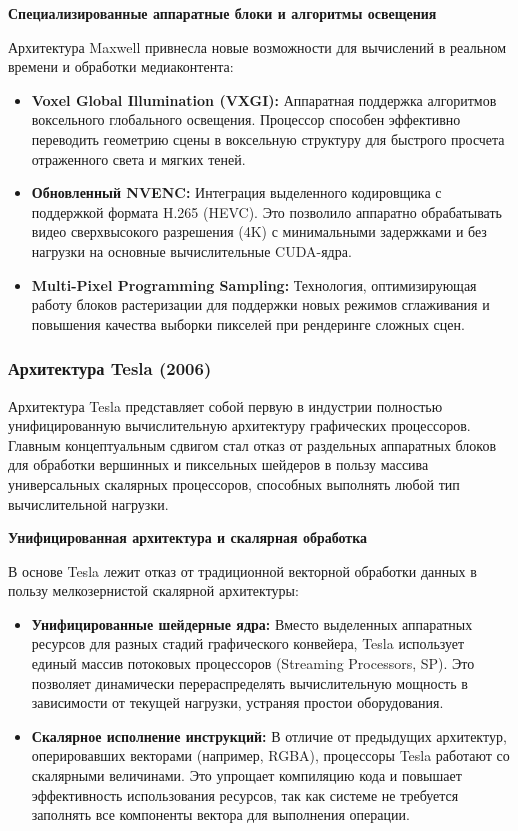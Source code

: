 \documentclass{article}[14pt]
\begin{document}
\medskip \noindent \textbf{Специализированные аппаратные блоки и алгоритмы освещения}

Архитектура Maxwell привнесла новые возможности для вычислений в реальном времени и обработки медиаконтента:
\begin{itemize}
    \item \textbf{Voxel Global Illumination (VXGI):} Аппаратная поддержка алгоритмов воксельного глобального освещения. Процессор способен эффективно переводить геометрию сцены в воксельную структуру для быстрого просчета отраженного света и мягких теней.
    \item \textbf{Обновленный NVENC:} Интеграция выделенного кодировщика с поддержкой формата H.265 (HEVC). Это позволило аппаратно обрабатывать видео сверхвысокого разрешения (4K) с минимальными задержками и без нагрузки на основные вычислительные CUDA-ядра.
    \item \textbf{Multi-Pixel Programming Sampling:} Технология, оптимизирующая работу блоков растеризации для поддержки новых режимов сглаживания и повышения качества выборки пикселей при рендеринге сложных сцен.
\end{itemize}

\subsubsection{Архитектура Tesla (2006)}

Архитектура Tesla представляет собой первую в индустрии полностью унифицированную вычислительную архитектуру графических процессоров. Главным концептуальным сдвигом стал отказ от раздельных аппаратных блоков для обработки вершинных и пиксельных шейдеров в пользу массива универсальных скалярных процессоров, способных выполнять любой тип вычислительной нагрузки.

\medskip \noindent \textbf{Унифицированная архитектура и скалярная обработка}

В основе Tesla лежит отказ от традиционной векторной обработки данных в пользу мелкозернистой скалярной архитектуры:
\begin{itemize}
    \item \textbf{Унифицированные шейдерные ядра:} Вместо выделенных аппаратных ресурсов для разных стадий графического конвейера, Tesla использует единый массив потоковых процессоров (Streaming Processors, SP). Это позволяет динамически перераспределять вычислительную мощность в зависимости от текущей нагрузки, устраняя простои оборудования.
    \item \textbf{Скалярное исполнение инструкций:} В отличие от предыдущих архитектур, оперировавших векторами (например, RGBA), процессоры Tesla работают со скалярными величинами. Это упрощает компиляцию кода и повышает эффективность использования ресурсов, так как системе не требуется заполнять все компоненты вектора для выполнения операции.
\end{itemize}
\end{document}

